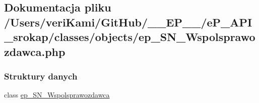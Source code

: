 \hypertarget{ep___s_n___wspolsprawozdawca_8php}{\subsection{Dokumentacja pliku /\-Users/veri\-Kami/\-Git\-Hub/\-\_\-\-\_\-\-E\-P\-\_\-\-\_\-/e\-P\-\_\-\-A\-P\-I\-\_\-srokap/classes/objects/ep\-\_\-\-S\-N\-\_\-\-Wspolsprawozdawca.php}
\label{ep___s_n___wspolsprawozdawca_8php}
}
\subsubsection*{Struktury danych}
\begin{DoxyCompactItemize}
\item 
class \hyperlink{classep___s_n___wspolsprawozdawca}{ep\-\_\-\-S\-N\-\_\-\-Wspolsprawozdawca}
\end{DoxyCompactItemize}
